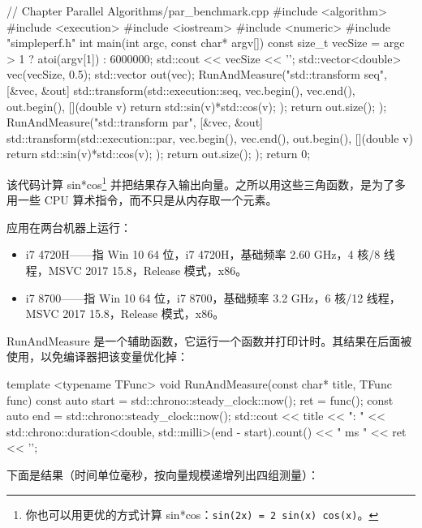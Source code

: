 \begin{codebox}[cpp]
// Chapter Parallel Algorithms/par_benchmark.cpp
#include <algorithm>
#include <execution>
#include <iostream>
#include <numeric>
#include "simpleperf.h"
int main(int argc, const char* argv[])
{
const size_t vecSize = argc > 1 ? atoi(argv[1]) : 6000000;
std::cout << vecSize << '\n';
std::vector<double> vec(vecSize, 0.5);
std::vector out(vec);
RunAndMeasure("std::transform seq", [&vec, &out] {
std::transform(std::execution::seq, vec.begin(), vec.end(), out.begin(),
[](double v) {
return std::sin(v)*std::cos(v);
}
);
return out.size();
});
RunAndMeasure("std::transform par", [&vec, &out] {
std::transform(std::execution::par, vec.begin(), vec.end(), out.begin(),
[](double v) {
return std::sin(v)*std::cos(v);
}
);
return out.size();
});
return 0;
}
\end{codebox}

该代码计算 sin*cos\footnote{你也可以用更优的方式计算 sin*cos：\texttt{sin(2x) = 2 sin(x) cos(x)}。} 并把结果存入输出向量。之所以用这些三角函数，是为了多用一些 CPU 算术指令，而不只是从内存取一个元素。

应用在两台机器上运行：
\begin{itemize}
\item i7 4720H——指 Win 10 64 位，i7 4720H，基础频率 2.60 GHz，4 核/8 线程，MSVC 2017 15.8，Release 模式，x86。
\item i7 8700——指 Win 10 64 位，i7 8700，基础频率 3.2 GHz，6 核/12 线程，MSVC 2017 15.8，Release 模式，x86。
\end{itemize}

RunAndMeasure 是一个辅助函数，它运行一个函数并打印计时。其结果在后面被使用，以免编译器把该变量优化掉：

\begin{codebox}[cpp]
template <typename TFunc> void RunAndMeasure(const char* title, TFunc func)
{
const auto start = std::chrono::steady_clock::now();
ret = func();
const auto end = std::chrono::steady_clock::now();
std::cout << title
<< ": " << std::chrono::duration<double, std::milli>(end - start).count()
<< " ms " << ret << '\n';
}
\end{codebox}

下面是结果（时间单位毫秒，按向量规模递增列出四组测量）：

